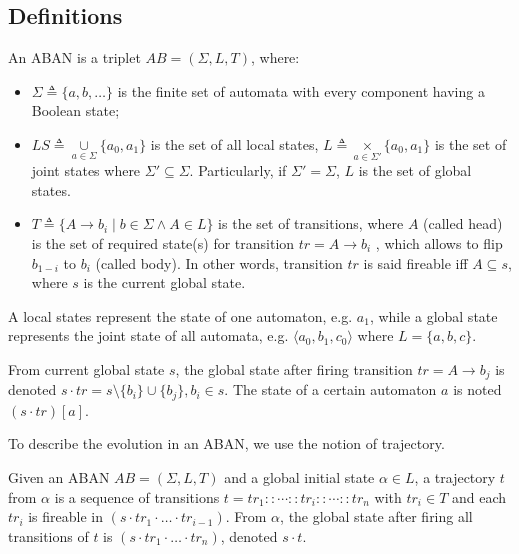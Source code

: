 \subsection{Definitions}
\begin{definition}[ABAN]
An ABAN is a triplet $AB = (\Sigma,L,T)$, where:
\begin{itemize}
\item $\Sigma\triangleq\{a,b,\ldots\}$ is the finite set of automata with every component having a Boolean state;
\item $LS\triangleq \underset{a\in \Sigma}{\cup} \{a_0,a_1\}$ is the set of all local states, $L\triangleq \underset{a\in \Sigma'}{\times} \{a_0,a_1\}$ is the set of joint states where $\Sigma'\subseteq\Sigma$. Particularly, if $\Sigma'=\Sigma$, $L$ is the set of global states. 
\item $T\triangleq \{A\rightarrow b_i\mid b\in \Sigma \land A\in L\}$ is the set of transitions, where $A$ (called head) is the set of required state(s) for transition $tr=A\to b_i$ , which allows to flip $b_{1-i}$ to $b_i$ (called body). In other words, transition $tr$ is said fireable iff $A\subseteq s$, where $s$ is the current global state.
\end{itemize}
\end{definition}

A local states represent the state of one automaton, e.g. $a_1$, while a global state represents the joint state of all automata, e.g. $\langle a_0, b_1,c_0 \rangle$ where $L=\{a,b,c\}$.

\begin{definition}[Dynamics]
    From current global state $s$, the global state after firing transition $tr=A\to b_j$ is denoted $s \cdot tr = s \setminus \{b_i\} \cup \{b_j\}, b_i \in s$.
    The state of a certain automaton $a$ is noted $(s\cdot tr)[a]$.
\end{definition}

To describe the evolution in an ABAN, we use the notion of trajectory.
\begin{definition}[Trajectory]
Given an ABAN $AB = (\Sigma,L,T)$ and a global initial state $\alpha\in L$, a trajectory $t$ from $\alpha$ is a sequence of transitions $t=tr_1::\cdots :: tr_i::\cdots ::tr_n$ with $tr_i\in T$ and each $tr_i$ is fireable in $(s \cdot tr_1 \cdot \ldots \cdot tr_{i-1})$.
From $\alpha$, the global state after firing all transitions of $t$ is $(s \cdot tr_1 \cdot \ldots \cdot tr_n)$, denoted $s \cdot t$.
\end{definition}

